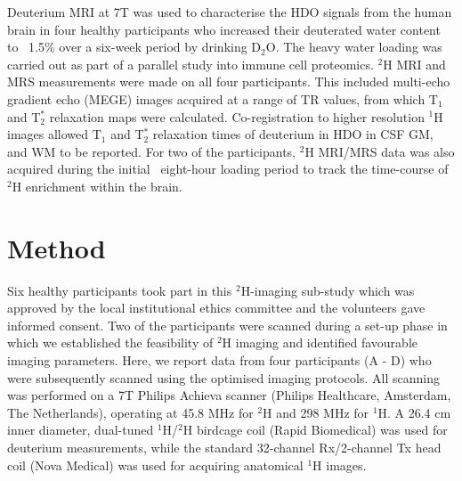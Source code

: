 \documentclass[class=article, crop=false]{standalone}
\begin{document}
Deuterium MRI at 7T was used to characterise the HDO signals from the human brain in four healthy participants who increased their deuterated water content to ~1.5\% over a six-week period by drinking D$_2$O. The heavy water loading was carried out as part of a parallel study into immune cell proteomics. $^2$H MRI and MRS measurements were made on all four participants. This included multi-echo gradient echo (MEGE) images acquired at a range of TR values, from which T$_1$ and T$_2^*$ relaxation maps were calculated. Co-registration to higher resolution $^1$H images allowed T$_1$ and T$_2^*$ relaxation times of deuterium in HDO in CSF GM, and WM to be reported. For two of the participants, $^2$H MRI/MRS data was also acquired during the initial ~eight-hour loading period to track the time-course of $^2$H enrichment within the brain\cite{Cocking2023DeuteriumDosing}. 


\section{Method}

Six healthy participants took part in this $^2$H-imaging sub-study which was approved by the local institutional ethics committee and the volunteers gave informed consent. Two of the participants were scanned during a set-up phase in which we established the feasibility of $^2$H imaging and identified favourable imaging parameters. Here, we report data from four participants (A - D) who were subsequently scanned using the optimised imaging protocols. All scanning was performed on a 7T Philips Achieva scanner (Philips Healthcare, Amsterdam, The Netherlands), operating at 45.8 MHz for $^2$H and 298 MHz for $^1$H. A 26.4 cm inner diameter, dual-tuned $^1$H/$^2$H birdcage coil (Rapid Biomedical) was used for deuterium measurements, while the standard 32-channel Rx/2-channel Tx head coil (Nova Medical) was used for acquiring anatomical $^1$H images.  
\end{document}
